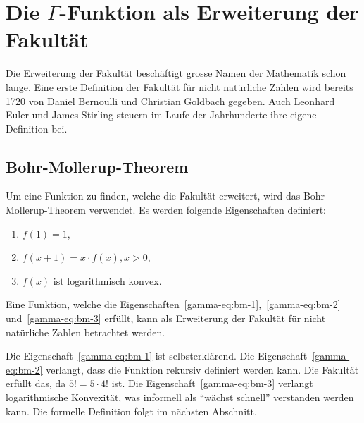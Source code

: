 %
%
%
%
\section{Die $\Gamma$-Funktion als Erweiterung der Fakultät\label{gamma:section:teil0}}

Die Erweiterung der Fakultät beschäftigt grosse Namen der Mathematik schon lange.
Eine erste Definition der Fakultät für nicht natürliche Zahlen wird bereits 1720 von Daniel Bernoulli und Christian Goldbach gegeben.
%
%
Auch Leonhard Euler und James Stirling steuern im Laufe der Jahrhunderte ihre eigene Definition bei. 
%
%

\subsection{Bohr-Mollerup-Theorem}\label{gamma:section:BMT}

Um eine Funktion zu finden, welche die Fakultät erweitert, wird das Bohr-Mollerup-Theorem \cite{mollerup1922laerebog} verwendet. Es werden folgende Eigenschaften definiert:
%
%
%

\begin{enumerate}
\item\label{gamma-eq:bm-1}$f(1) = 1$,
\item\label{gamma-eq:bm-2}$f(x+1) = x \cdot f(x), x > 0$,
\item\label{gamma-eq:bm-3}$f(x) \text{ ist logarithmisch konvex}$.
\end{enumerate}

\noindent
Eine Funktion, welche die Eigenschaften~\ref{gamma-eq:bm-1},~\ref{gamma-eq:bm-2} und~\ref{gamma-eq:bm-3} erfüllt,
kann als Erweiterung der Fakultät für nicht natürliche Zahlen betrachtet werden.

Die Eigenschaft~\ref{gamma-eq:bm-1} ist selbsterklärend.
Die Eigenschaft~\ref{gamma-eq:bm-2} verlangt, dass die Funktion rekursiv definiert werden kann.
Die Fakultät erfüllt das, da $5! = 5 \cdot 4!$ ist.
Die Eigenschaft~\ref{gamma-eq:bm-3} verlangt logarithmische Konvexität, was informell als ``wächst schnell'' verstanden werden kann.
Die formelle Definition folgt im nächsten Abschnitt.

